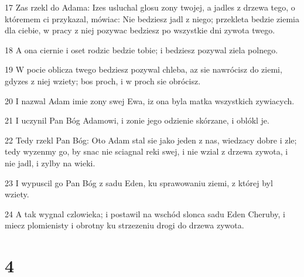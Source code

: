 \par 17 Zas rzekl do Adama: Izes usluchal glosu zony twojej, a jadles z drzewa tego, o któremem ci przykazal, mówiac: Nie bedziesz jadl z niego; przekleta bedzie ziemia dla ciebie, w pracy z niej pozywac bedziesz po wszystkie dni zywota twego.
\par 18 A ona ciernie i oset rodzic bedzie tobie; i bedziesz pozywal ziela polnego.
\par 19 W pocie oblicza twego bedziesz pozywal chleba, az sie nawrócisz do ziemi, gdyzes z niej wziety; bos proch, i w proch sie obrócisz.
\par 20 I nazwal Adam imie zony swej Ewa, iz ona byla matka wszystkich zywiacych.
\par 21 I uczynil Pan Bóg Adamowi, i zonie jego odzienie skórzane, i oblókl je.
\par 22 Tedy rzekl Pan Bóg: Oto Adam stal sie jako jeden z nas, wiedzacy dobre i zle; tedy wyzenmy go, by snac nie sciagnal reki swej, i nie wzial z drzewa zywota, i nie jadl, i zylby na wieki.
\par 23 I wypuscil go Pan Bóg z sadu Eden, ku sprawowaniu ziemi, z której byl wziety.
\par 24 A tak wygnal czlowieka; i postawil na wschód slonca sadu Eden Cheruby, i miecz plomienisty i obrotny ku strzezeniu drogi do drzewa zywota.

\chapter{4}

